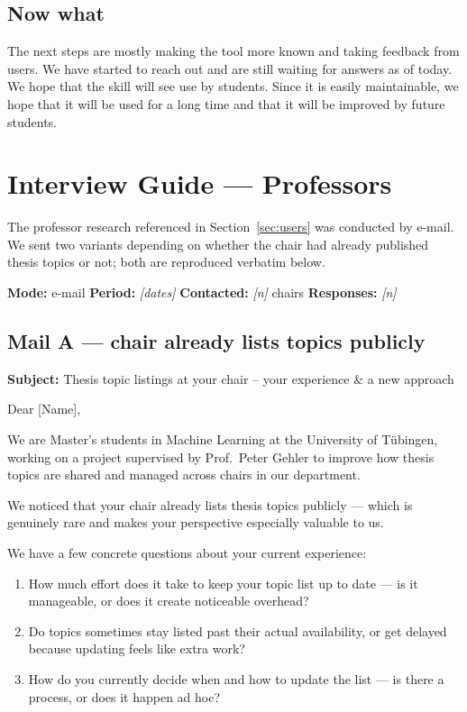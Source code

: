 \documentclass[11pt,a4paper]{article}
\begin{document}
\subsection*{Now what}

\noindent The next steps are mostly making the tool more known and taking feedback from users. We have started to reach out and are still waiting for answers as of today. 
We hope that the skill will see use by students. Since it is easily maintainable, we hope that it will be used for a long time and that it will be improved by future students.
\appendix
\section{Interview Guide --- Professors}
\label{app:prof-interview}

\noindent The professor research referenced in Section~\ref{sec:users} was
conducted by e-mail. We sent two variants depending on whether the chair had already
published thesis topics or not; both are reproduced verbatim below.


\noindent\textbf{Mode:} e-mail \quad\textbullet\quad
\textbf{Period:} \emph{[dates]} \quad\textbullet\quad
\textbf{Contacted:} \emph{[n]} chairs \quad\textbullet\quad
\textbf{Responses:} \emph{[n]}

\subsection*{Mail A --- chair already lists topics publicly}

\noindent\textbf{Subject:} Thesis topic listings at your chair -- your experience \& a new approach

\medskip
\noindent Dear [Name],

\medskip
\noindent We are Master's students in Machine Learning at the University of
T\"ubingen, working on a project supervised by Prof.\ Peter Gehler to improve how
thesis topics are shared and managed across chairs in our department.

\medskip
\noindent We noticed that your chair already lists thesis topics publicly ---
which is genuinely rare and makes your perspective especially valuable to us.

\medskip
\noindent We have a few concrete questions about your current experience:

\begin{enumerate}[leftmargin=1.4em,itemsep=0.35em]
  \item How much effort does it take to keep your topic list up to date --- is
 it manageable, or does it create noticeable overhead?
  \item Do topics sometimes stay listed past their actual availability, or get
 delayed because updating feels like extra work?
  \item How do you currently decide when and how to update the list --- is there
 a process, or does it happen ad hoc?
\end{enumerate}
\end{document}
